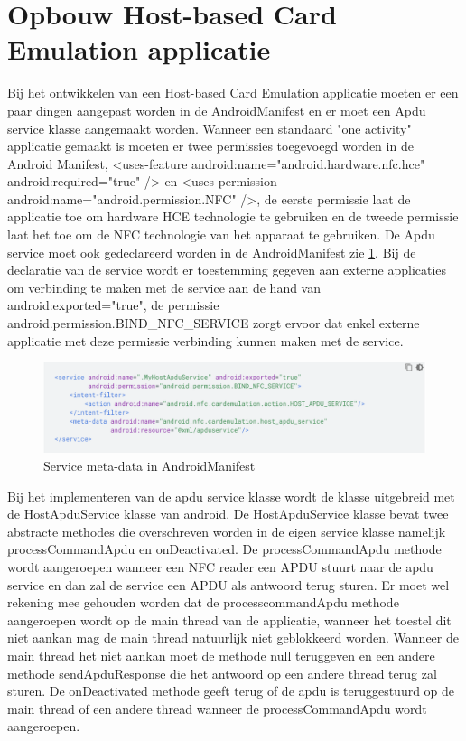 \section{Opbouw Host-based Card Emulation applicatie}
 
 Bij het ontwikkelen van een Host-based Card Emulation applicatie moeten er een paar dingen aangepast worden in de AndroidManifest en er moet een Apdu service klasse aangemaakt worden. Wanneer een standaard "one activity" applicatie gemaakt is moeten er twee permissies toegevoegd worden in de Android Manifest, <uses-feature android:name="android.hardware.nfc.hce" android:required="true" /> en <uses-permission android:name="android.permission.NFC" />, de eerste permissie laat de applicatie toe om hardware HCE technologie te gebruiken en de tweede permissie laat het toe om de NFC technologie van het apparaat te gebruiken. De Apdu service moet ook gedeclareerd worden in de AndroidManifest zie \ref{fig:Manifest}. Bij de declaratie van de service wordt er toestemming gegeven aan externe applicaties om verbinding te maken met de service aan de hand van android:exported="true", de permissie android.permission.BIND\_NFC\_SERVICE zorgt ervoor dat enkel externe applicatie met deze permissie verbinding kunnen maken met de service.
 
 \begin{figure}
 	\includegraphics[width=\linewidth]
 	{img/ManifestService}
 	\caption{Service meta-data in AndroidManifest}
 	\label{fig:Manifest}
 \end{figure}

Bij het implementeren van de apdu service klasse wordt de klasse uitgebreid met de HostApduService klasse van android. De HostApduService klasse bevat twee abstracte methodes die overschreven worden in de eigen service klasse namelijk processCommandApdu en onDeactivated. De processCommandApdu methode wordt aangeroepen wanneer een NFC reader een APDU stuurt naar de apdu service en dan zal de service een APDU als antwoord terug sturen. Er moet wel rekening mee gehouden worden dat de processcommandApdu methode aangeroepen wordt op de main thread van de applicatie, wanneer het toestel dit niet aankan mag de main thread natuurlijk niet geblokkeerd worden. Wanneer de main thread het niet aankan moet de methode null teruggeven en een andere methode sendApduResponse die het antwoord op een andere thread terug zal sturen. De onDeactivated methode geeft terug of de apdu is teruggestuurd op de main thread of een andere thread wanneer de processCommandApdu wordt aangeroepen.

